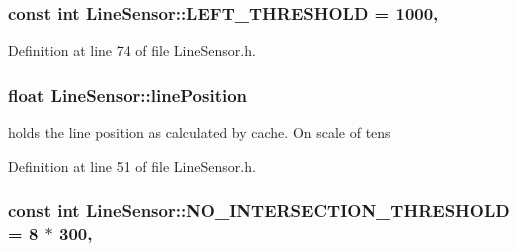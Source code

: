 \hypertarget{classLineSensor_a06d5f222428084879e9a0fc38d8b0b5e}{
\subsubsection[{L\-E\-F\-T\-\_\-\-T\-H\-R\-E\-S\-H\-O\-L\-D}]{\setlength{\rightskip}{0pt plus 5cm}const int Line\-Sensor\-::\-L\-E\-F\-T\-\_\-\-T\-H\-R\-E\-S\-H\-O\-L\-D = 1000\hspace{0.3cm}{\ttfamily [static]}, {\ttfamily [private]}}}\label{classLineSensor_a06d5f222428084879e9a0fc38d8b0b5e}


Definition at line 74 of file Line\-Sensor.\-h.

\hypertarget{classLineSensor_ac21af83a73e9e55500324d9d34ed2498}{
\subsubsection[{line\-Position}]{\setlength{\rightskip}{0pt plus 5cm}float Line\-Sensor\-::line\-Position\hspace{0.3cm}{\ttfamily [private]}}}\label{classLineSensor_ac21af83a73e9e55500324d9d34ed2498}


holds the line position as calculated by cache. On scale of tens 



Definition at line 51 of file Line\-Sensor.\-h.

\hypertarget{classLineSensor_a76ae45af94dc228b239e7e9812955a6c}{
\subsubsection[{N\-O\-\_\-\-I\-N\-T\-E\-R\-S\-E\-C\-T\-I\-O\-N\-\_\-\-T\-H\-R\-E\-S\-H\-O\-L\-D}]{\setlength{\rightskip}{0pt plus 5cm}const int Line\-Sensor\-::\-N\-O\-\_\-\-I\-N\-T\-E\-R\-S\-E\-C\-T\-I\-O\-N\-\_\-\-T\-H\-R\-E\-S\-H\-O\-L\-D = 8 $\ast$ 300\hspace{0.3cm}{\ttfamily [static]}, {\ttfamily [private]}}}\label{classLineSensor_a76ae45af94dc228b239e7e9812955a6c}


